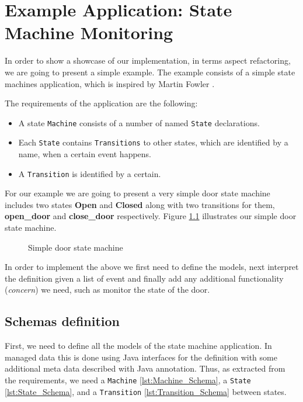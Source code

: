 
\chapter{Example Application: State Machine Monitoring}\label{Example Application}
In order to show a showcase of our implementation, in terms aspect refactoring, we are going to present a simple example.
The example consists of a simple state machines application, which is inspired by Martin Fowler \cite{fowler2010domain}.

The requirements of the application are the following: 
\begin{itemize}
	\item A state \texttt{Machine} consists of a number of named \texttt{State} declarations.

	\item Each \texttt{State} contains \texttt{Transitions} to other states, which are identified by a name, when a certain event happens.

	\item A \texttt{Transition} is identified by a certain.
\end{itemize}

For our example we are going to present a very simple door state machine includes two states \textbf{Open} and \textbf{Closed} along with two transitions for them, \textbf{open\_door} and \textbf{close\_door} respectively.
Figure \ref{fig:State_machine} illustrates our simple door state machine.

\begin{figure}[H]
	\centering
  	\caption{Simple door state machine}
  	\label{fig:State_machine}
\end{figure}

In order to implement the above we first need to define the models, next interpret the definition given a list of event and finally add any additional functionality (\textit{concern}) we need, such as monitor the state of the door.

\section{Schemas definition}
First, we need to define all the models of the state machine application. 
In managed data this is done using Java interfaces for the definition with some additional meta data described with Java annotation.
Thus, as extracted from the requirements, we need a \texttt{Machine} \ref{lst:Machine_Schema}, a \texttt{State} \ref{lst:State_Schema}, and a \texttt{Transition} \ref{lst:Transition_Schema} between states.

